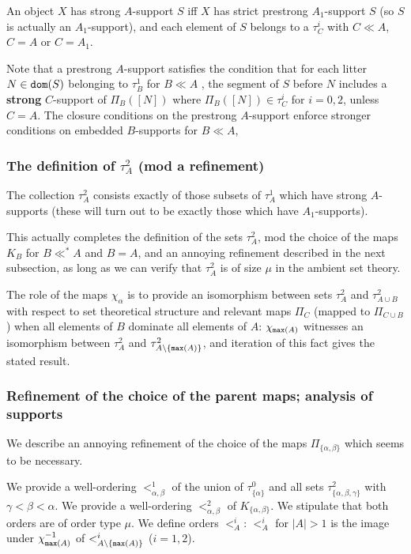 \documentclass[12pt]{article}
\begin{document}
An object $X$ has strong $A$-support $S$ iff $X$ has strict prestrong $A_1$-support $S$ (so $S$ is actually an $A_1$-support), and each element of $S$ belongs to 
a $\tau^i_C$ with $C \ll A$, $C=A$ or $C = A_1$.

Note that a prestrong $A$-support satisfies the condition that for each litter $N \in{\tt dom}(S)$ belonging to $\tau^1_B$ for $B \ll A$
, the segment of $S$
before $N$ includes  a {\bf strong} $C$-support of $\Pi_B([N])$ where  $\Pi_B([N])\in \tau^i_C$ for $i=0,2$, unless $C=A$.  The closure conditions on the
prestrong $A$-support enforce stronger conditions on embedded $B$-supports for $B \ll A$,

\newpage

\subsubsection{The definition of $\tau^2_A$ (mod a refinement)}

The collection $\tau^2_A$ consists exactly of those subsets of $\tau^1_A$ which have strong $A$-supports (these will turn out to be exactly those which have $A_1$-supports).

This actually completes the definition of the sets $\tau^2_A$, mod the choice of the maps $K_B$ for $B \ll^* A$ and $B=A$, and an annoying refinement described in the next subsection, as long as we can verify that $\tau^2_A$ is of size $\mu$
in the ambient set theory.

The role of the maps $\chi_{\alpha}$ is to provide an isomorphism between sets $\tau^2_A$ and $\tau^2_{A \cup B}$ with respect to set theoretical structure and relevant maps $\Pi_C$ (mapped to $\Pi_{C \cup B}$) when all elements of $B$ dominate all elements of $A$:
$\chi_{{\tt max}(A)}$ witnesses an isomorphism between $\tau^2_A$ and $\tau^2_{A \setminus \{{\tt max}(A)\}}$, and iteration of this fact gives the stated result.

\newpage

\subsubsection{Refinement of the choice of the parent maps; analysis of supports}

We describe an annoying refinement of the choice of the maps $\Pi_{\{\alpha,\beta\}}$ which seems to be necessary.

We provide a well-ordering $<^1_{\alpha,\beta}$ of the union of $\tau^0_{\{\alpha\}}$ and all sets $\tau^2_{\{\alpha,\beta,\gamma\}}$ with $\gamma<\beta<\alpha$.  We provide a well-ordering $<^2_{\alpha,\beta}$ of $K_{\{\alpha,\beta\}}$.  We stipulate that both orders are of order type $\mu$.  We define orders $<^i_A$:  $<^i_A$ for $|A|>1$ is the image under $\chi_{{\tt max}(A)}^{-1}$ of $<^i_{A \setminus \{{\tt max}(A)\}}$ ($i=1,2$).
\end{document}
